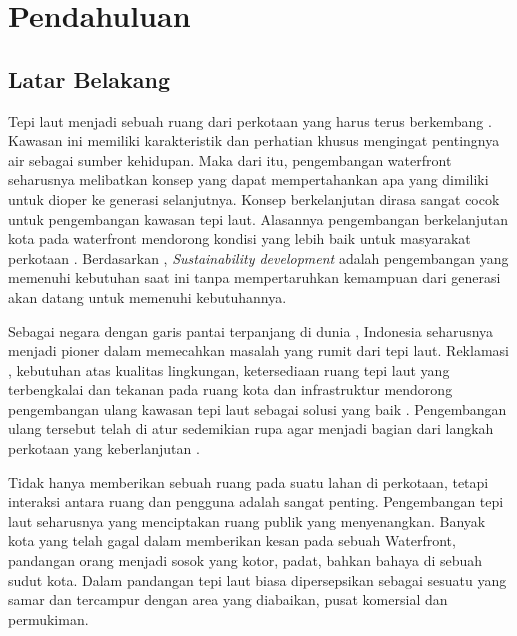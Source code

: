 \documentclass[../projects/thesis.tex]{subfiles}
\begin{document}
\chapter{Pendahuluan}\label{chap:pendahuluan}

\section{Latar Belakang}


Tepi laut menjadi sebuah ruang dari perkotaan yang harus terus berkembang \cite{shamsuddin2013}. Kawasan ini memiliki karakteristik dan perhatian khusus mengingat pentingnya air sebagai sumber kehidupan. Maka dari itu,
pengembangan waterfront seharusnya melibatkan konsep yang dapat mempertahankan apa yang dimiliki untuk dioper ke generasi selanjutnya.
Konsep berkelanjutan dirasa sangat cocok untuk pengembangan kawasan tepi laut. Alasannya pengembangan berkelanjutan kota pada waterfront mendorong kondisi yang lebih baik untuk masyarakat perkotaan \citep{brebbia2016sustainable}.
Berdasarkan \cite{imperatives1987}, \textit{Sustainability development} adalah pengembangan yang memenuhi kebutuhan saat ini tanpa mempertaruhkan kemampuan dari generasi akan datang untuk memenuhi kebutuhannya.

Sebagai negara dengan garis pantai terpanjang di dunia \citep{hindersah2015}, Indonesia seharusnya menjadi pioner dalam memecahkan masalah yang rumit dari tepi laut.
Reklamasi \citep{andi2017}, kebutuhan atas kualitas lingkungan, ketersediaan ruang tepi laut yang terbengkalai \citep{goodwin1999} dan tekanan pada ruang kota dan infrastruktur mendorong pengembangan ulang kawasan tepi laut sebagai solusi yang baik \citep{breen1994}.
Pengembangan ulang tersebut telah di atur sedemikian rupa agar menjadi bagian dari langkah perkotaan yang keberlanjutan \citep{pramesti2017}.





\begin{comment}
Menurut \cite{shamsuddin2013}, riverside merupakan ruang perkotaan yang harus terus berkembang. Kawasan inilah yang diberkahi dengan karakteristik dan perhatian khusus mengingat pentingnya air sebagai sumber kehidupan kota.
Pada area laut perkotaan, lomba untuk ruang waterfront, kebutuhan publik untuk mengakses pesisir laut dan mempertahankan biodiversity tepi laut sebagai sumber alami menjadi isu terhangat dalam kebijakan perkotaan \citep{breen1994waterfronts}.
\end{comment}
Tidak hanya memberikan sebuah ruang pada suatu lahan di perkotaan, tetapi interaksi antara ruang dan pengguna adalah sangat penting. Pengembangan tepi laut seharusnya yang menciptakan ruang publik yang menyenangkan. Banyak kota yang telah gagal dalam memberikan kesan pada sebuah Waterfront, pandangan orang menjadi sosok yang kotor, padat, bahkan bahaya di sebuah sudut kota. Dalam pandangan \cite{goodwin1999} tepi laut biasa dipersepsikan sebagai sesuatu yang samar dan tercampur dengan area yang diabaikan, pusat komersial dan permukiman.
\end{document}
